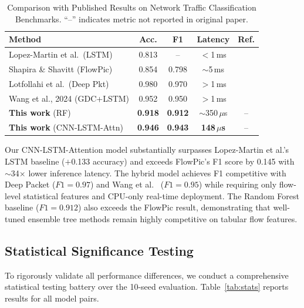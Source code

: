 \documentclass[conference]{IEEEtran}
\begin{document}
\begin{table}[htbp]
\centering
\renewcommand{\arraystretch}{1.12}
\caption{Comparison with Published Results on Network Traffic Classification Benchmarks.
         ``--'' indicates metric not reported in original paper.}
\label{tab:published}
\begin{tabular}{lcccc}
\toprule
\textbf{Method} & \textbf{Acc.} & \textbf{F1} & \textbf{Latency} & \textbf{Ref.} \\
\midrule
Lopez-Martin et al.\ (LSTM) & 0.813 & -- & $<$1\,ms & \cite{lopezmartin2017} \\
Shapira \& Shavitt (FlowPic) & 0.854 & 0.798 & $\sim$5\,ms & \cite{shapira2021} \\
Lotfollahi et al.\ (Deep Pkt) & 0.980 & 0.970 & $>$1\,ms & \cite{lotfollahi2020} \\
Wang et al., 2024 (GDC+LSTM) & 0.952 & 0.950 & $>$1\,ms & \cite{wang2024} \\
\midrule
\textbf{This work} (RF) & \textbf{0.918} & \textbf{0.912} & $\sim$350\,$\mu$s & -- \\
\textbf{This work} (CNN-LSTM-Attn) & \textbf{0.946} & \textbf{0.943} & \textbf{148\,$\mu$s} & -- \\
\bottomrule
\end{tabular}
\end{table}

Our CNN-LSTM-Attention model substantially surpasses Lopez-Martin et al.'s LSTM baseline
($+$0.133 accuracy) and exceeds FlowPic's F1 score by 0.145 with
$\sim$34$\times$ lower inference latency. The hybrid model achieves F1
competitive with Deep Packet \cite{lotfollahi2020} ($F1 = 0.97$) and Wang et al.\
\cite{wang2024} ($F1 = 0.95$) while requiring only flow-level statistical features
and CPU-only real-time deployment. The Random Forest baseline ($F1 = 0.912$) also
exceeds the FlowPic result, demonstrating that well-tuned ensemble tree methods
remain highly competitive on tabular flow features.

\subsection{Statistical Significance Testing}
\label{ssec:stats}

To rigorously validate all performance differences, we conduct a comprehensive
statistical testing battery over the 10-seed evaluation. Table~\ref{tab:stats}
reports results for all model pairs.
\end{document}
